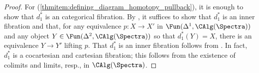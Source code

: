 \begin{proof}
    For (\ref{thmitem:defining_diagram_homotopy_pullback}), it is enough to show that $d_1^*$ is an categorical fibration. 
    By \cite[Corollary 2.4.6.5]{HTT}, it suffices to show that $ d_1^* $ is an inner fibration and that, for any equivalence $ p \colon X \to X' $ in $ \Fun(\Delta^1, \CAlg(\Spectra)) $ and any object $ Y \in \Fun(\Delta^2, \CAlg(\Spectra)) $ so that $ d_1^*(Y) = X $, there is an equivalence $ Y \to Y' $ lifting $ p $. 
    That $ d_1^*$ is an inner fibration follows from \cite[Corollary 2.3.2.5]{HTT}. 
    In fact, $ d_1^* $ is a cocartesian and cartesian fibration; this follows from the existence of colimits and limits, resp., in $ \CAlg(\Spectra) $.


\end{proof}
